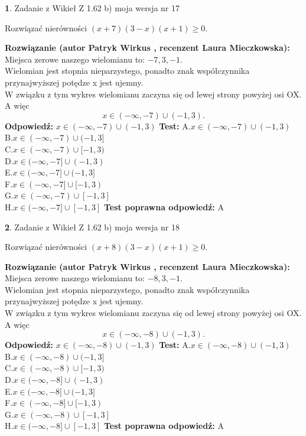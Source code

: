 \documentclass[12pt, a4paper]{article}
\theoremstyle{definition} %
\newtheorem{zad}{}
\newcommand{\zadStart}[1]{\begin{zad}#1\newline}
\newcommand{\zadStop}{\end{zad}}
\newcommand{\rozwStart}[2]{\noindent \textbf{Rozwiązanie (autor #1 , recenzent #2): }\newline}
\newcommand{\rozwStop}{\newline}
\newcommand{\odpStart}{\noindent \textbf{Odpowiedź:}\newline}
\newcommand{\odpStop}{\newline}
\newcommand{\testStart}{\noindent \textbf{Test:}\newline}
\newcommand{\testStop}{\newline}
\newcommand{\kluczStart}{\noindent \textbf{Test poprawna odpowiedź:}\newline}
\newcommand{\kluczStop}{\newline}
\begin{document}
\zadStart{Zadanie z Wikieł Z 1.62 b) moja wersja nr 17}

Rozwiązać nierówności $(x+7)(3-x)(x+1)\ge0$.
\zadStop
\rozwStart{Patryk Wirkus}{Laura Mieczkowska}
Miejsca zerowe naszego wielomianu to: $-7, 3, -1$.\\
Wielomian jest stopnia nieparzystego, ponadto znak współczynnika przy\linebreak najwyższej potędze x jest ujemny.\\ W związku z tym wykres wielomianu zaczyna się od lewej strony powyżej osi OX. A więc $$x \in (-\infty,-7) \cup (-1,3).$$
\rozwStop
\odpStart
$x \in (-\infty,-7) \cup (-1,3)$
\odpStop
\testStart
A.$x \in (-\infty,-7) \cup (-1,3)$\\
B.$x \in (-\infty,-7) \cup (-1,3]$\\
C.$x \in (-\infty,-7) \cup [-1,3)$\\
D.$x \in (-\infty,-7] \cup (-1,3)$\\
E.$x \in (-\infty,-7] \cup (-1,3]$\\
F.$x \in (-\infty,-7] \cup [-1,3)$\\
G.$x \in (-\infty,-7) \cup [-1,3]$\\
H.$x \in (-\infty,-7] \cup [-1,3]$
\testStop
\kluczStart
A
\kluczStop



\zadStart{Zadanie z Wikieł Z 1.62 b) moja wersja nr 18}

Rozwiązać nierówności $(x+8)(3-x)(x+1)\ge0$.
\zadStop
\rozwStart{Patryk Wirkus}{Laura Mieczkowska}
Miejsca zerowe naszego wielomianu to: $-8, 3, -1$.\\
Wielomian jest stopnia nieparzystego, ponadto znak współczynnika przy\linebreak najwyższej potędze x jest ujemny.\\ W związku z tym wykres wielomianu zaczyna się od lewej strony powyżej osi OX. A więc $$x \in (-\infty,-8) \cup (-1,3).$$
\rozwStop
\odpStart
$x \in (-\infty,-8) \cup (-1,3)$
\odpStop
\testStart
A.$x \in (-\infty,-8) \cup (-1,3)$\\
B.$x \in (-\infty,-8) \cup (-1,3]$\\
C.$x \in (-\infty,-8) \cup [-1,3)$\\
D.$x \in (-\infty,-8] \cup (-1,3)$\\
E.$x \in (-\infty,-8] \cup (-1,3]$\\
F.$x \in (-\infty,-8] \cup [-1,3)$\\
G.$x \in (-\infty,-8) \cup [-1,3]$\\
H.$x \in (-\infty,-8] \cup [-1,3]$
\testStop
\kluczStart
A
\kluczStop
\end{document}

